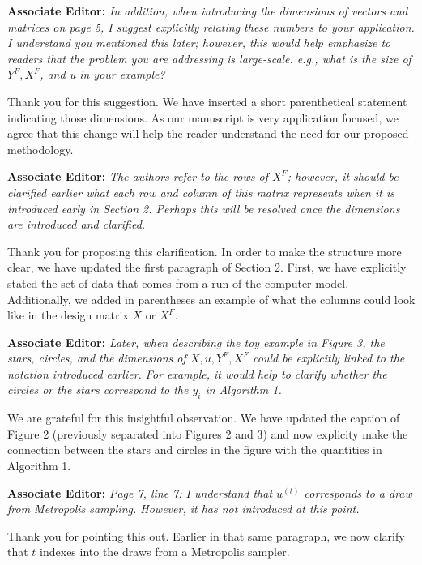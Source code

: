 \documentclass[12pt]{article}
\begin{document}
\bigskip
\noindent
\textbf{Associate Editor:} \textit{In addition, when introducing the dimensions
of vectors and matrices on page 5, I suggest explicitly relating these numbers
to your application. I understand you mentioned this later; however, this
would help emphasize to readers that the problem you are addressing is
large-scale. e.g., what is the size of \(Y^F, X^F\), and u in your example?}

\bigskip
\noindent
Thank you for this suggestion. We have inserted a short parenthetical
statement indicating those dimensions. As our manuscript is very application
focused, we agree that this change will help the reader understand the need
for our proposed methodology.

\bigskip
\noindent
\textbf{Associate Editor:} \textit{The authors refer to the rows of \(X^F\);
however, it should be clarified earlier what each row and column of this
matrix represents when it is introduced early in Section 2. Perhaps this will
be resolved once the dimensions are introduced and clarified.}

\bigskip
\noindent
Thank you for proposing this clarification. In order to make the structure
more clear, we have updated the first paragraph of Section 2. First, we have
explicitly stated the set of data that comes from a run of the computer model.
Additionally, we added in parentheses an example of what the columns could
look like in the design matrix $X$ or $X^F$.

\bigskip
\noindent
\textbf{Associate Editor:} \textit{Later, when describing the toy example in
Figure 3, the stars, circles, and the dimensions of \(X, u, Y^F, X^F\) could
be explicitly linked to the notation introduced earlier. For example, it would
help to clarify whether the circles or the stars correspond to the \(y_i\) in
Algorithm 1.}

\bigskip
\noindent
We are grateful for this insightful observation. We have updated the caption
of Figure 2 (previously separated into Figures 2 and 3) and now explicity make
the connection between the stars and circles in the figure with the quantities
in Algorithm 1.

\bigskip
\noindent
\textbf{Associate Editor:} \textit{Page 7, line 7: I understand that
\(u^{(t)}\) corresponds to a draw from Metropolis sampling. However, it has
not introduced at this point.}

\bigskip
\noindent
Thank you for pointing this out. Earlier in that same paragraph, we now
clarify that $t$ indexes into the draws from a Metropolis sampler.
\end{document}
